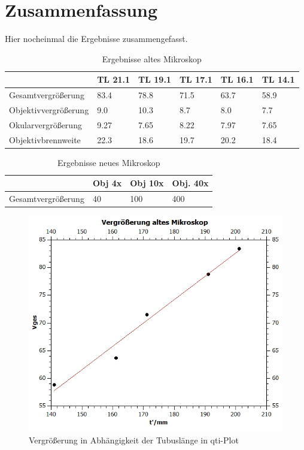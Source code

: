 \documentclass[12pt,a4paper,twoside]{article}
\begin{document}
\section{Zusammenfassung} %

Hier nocheinmal die Ergebnisse zusammengefasst.

\begin{table}[H]
    \centering
    \caption{Ergebnisse altes Mikroskop}
    \label{tab:ErgebnisseAM}
    \begin{tabular}{| l | l | l | l | l | l |}
        \hline
         & TL 21.1 & TL 19.1 & TL 17.1 & TL 16.1 & TL 14.1 \\
        \hline
        Gesamtvergrößerung & 83.4 & 78.8 & 71.5 & 63.7 & 58.9 \\
        Objektivvergrößerung & 9.0 & 10.3 & 8.7 & 8.0 & 7.7 \\
        Okularvergrößerung & 9.27 & 7.65 & 8.22 & 7.97 & 7.65 \\
        Objektivbrennweite & 22.3 & 18.6 & 19.7 & 20.2 & 18.4 \\
        \hline
    \end{tabular}
\end{table}

\begin{table}[H]
    \centering
    \caption{Ergebnisse neues Mikroskop}
    \label{tab:ErgebnisseNM}
    \begin{tabular}{| l | l | l | l |}
        \hline
         & Obj 4x & Obj 10x & Obj. 40x \\
        \hline
        Gesamtvergrößerung & 40 & 100 & 400 \\
        \hline
    \end{tabular}
\end{table}

\begin{figure}[H]
    \centering
    \includegraphics[width=0.6\linewidth, angle=0]{nudes/VergrößerungAltesMik.jpg}
    \caption{Vergrößerung in Abhängigkeit der Tubuslänge in qti-Plot}
    \label{fig:VergrößerungDiagramm}
\end{figure}



\printbibliography[heading=bibintoc]
\end{document}
